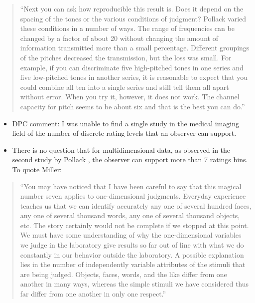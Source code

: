 \documentclass[
]{book}
\begin{document}
\begin{quote}
``Next you can ask how reproducible this result is. Does it depend on the spacing of the tones or the various conditions of judgment? Pollack varied these conditions in a number of ways. The range of frequencies can be changed by a factor of about 20 without changing the amount of information transmitted more than a small percentage. Different groupings of the pitches decreased the transmission, but the loss was small. For example, if you can discriminate five high-pitched tones in one series and five low-pitched tones in another series, it is reasonable to expect that you could combine all ten into a single series and still tell them all apart without error. When you try it, however, it does not work. The channel capacity for pitch seems to be about six and that is the best you can do.''
\end{quote}

\begin{itemize}
\item
  DPC comment: I was unable to find a single study in the medical imaging field of the number of discrete rating levels that an observer can support.
\item
  There is no question that for multidimensional data, as observed in the second study by Pollack \citep{pollack1953information}, the observer can support more than 7 ratings bins. To quote Miller:
\end{itemize}

\begin{quote}
``You may have noticed that I have been careful to say that this magical number seven applies to one-dimensional judgments. Everyday experience teaches us that we can identify accurately any one of several hundred faces, any one of several thousand words, any one of several thousand objects, etc. The story certainly would not be complete if we stopped at this point. We must have some understanding of why the one-dimensional variables we judge in the laboratory give results so far out of line with what we do constantly in our behavior outside the laboratory. A possible explanation lies in the number of independently variable attributes of the stimuli that are being judged. Objects, faces, words, and the like differ from one another in many ways, whereas the simple stimuli we have considered thus far differ from one another in only one respect.''
\end{quote}
\end{document}
